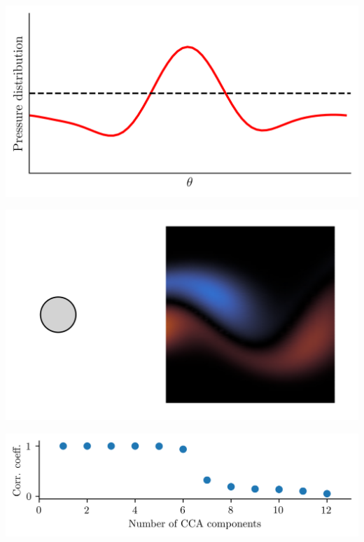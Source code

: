 \documentclass[aspectratio=169, usenames, dvipsnames]{beamer}
\begin{document}
{


\begin{frame}
  \vfill
  \begin{minipage}{.48\textwidth}
    \includegraphics[width=\textwidth]{pressure_distribution}
  \end{minipage}%
  \hfill
  \begin{minipage}{.48\textwidth}
    \includegraphics[width=\textwidth]{cylinder_cca_setup}
  \end{minipage}
  \vfill
\end{frame}

\begin{frame}
  \centering
  \includegraphics[width=\textwidth]{CCA_svd}


\end{frame}}
\end{document}
